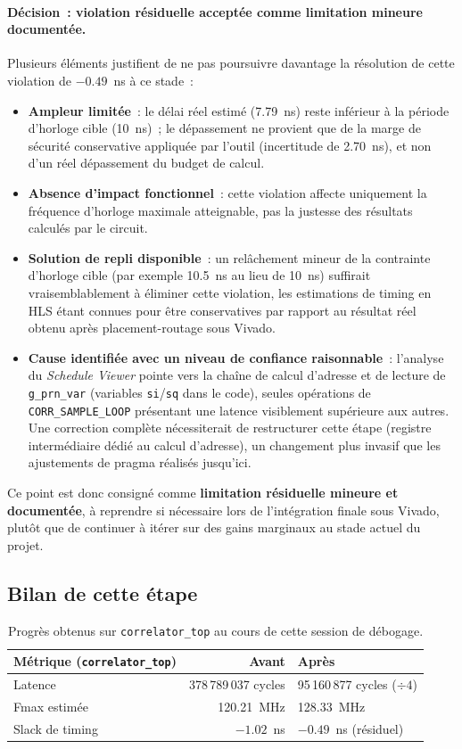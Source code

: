 \documentclass[11pt,a4paper]{article}
\begin{document}
\paragraph{Décision~: violation résiduelle acceptée comme limitation mineure documentée.}
Plusieurs éléments justifient de ne pas poursuivre davantage la résolution de cette violation de $-0.49$~ns à ce stade~:
\begin{itemize}
  \item \textbf{Ampleur limitée}~: le délai réel estimé (7.79~ns) reste inférieur à la période d'horloge cible (10~ns)~; le dépassement ne provient que de la marge de sécurité conservative appliquée par l'outil (incertitude de 2.70~ns), et non d'un réel dépassement du budget de calcul.
  \item \textbf{Absence d'impact fonctionnel}~: cette violation affecte uniquement la fréquence d'horloge maximale atteignable, pas la justesse des résultats calculés par le circuit.
  \item \textbf{Solution de repli disponible}~: un relâchement mineur de la contrainte d'horloge cible (par exemple 10.5~ns au lieu de 10~ns) suffirait vraisemblablement à éliminer cette violation, les estimations de timing en HLS étant connues pour être conservatives par rapport au résultat réel obtenu après placement-routage sous Vivado.
  \item \textbf{Cause identifiée avec un niveau de confiance raisonnable}~: l'analyse du \textit{Schedule Viewer} pointe vers la chaîne de calcul d'adresse et de lecture de \texttt{g\_prn\_var} (variables \texttt{si}/\texttt{sq} dans le code), seules opérations de \texttt{CORR\_SAMPLE\_LOOP} présentant une latence visiblement supérieure aux autres. Une correction complète nécessiterait de restructurer cette étape (registre intermédiaire dédié au calcul d'adresse), un changement plus invasif que les ajustements de pragma réalisés jusqu'ici.
\end{itemize}

Ce point est donc consigné comme \textbf{limitation résiduelle mineure et documentée}, à reprendre si nécessaire lors de l'intégration finale sous Vivado, plutôt que de continuer à itérer sur des gains marginaux au stade actuel du projet.

\subsection{Bilan de cette étape}

\begin{table}[H]
\centering
\renewcommand{\arraystretch}{1.3}
\begin{tabular}{lrl}
\toprule
\textbf{Métrique (\texttt{correlator\_top})} & \textbf{Avant} & \textbf{Après} \\
\midrule
Latence & 378\,789\,037 cycles & 95\,160\,877 cycles ($\div 4$) \\
Fmax estimée & 120.21~MHz & 128.33~MHz \\
Slack de timing & $-1.02$~ns & $-0.49$~ns (résiduel) \\
\bottomrule
\end{tabular}
\caption{Progrès obtenus sur \texttt{correlator\_top} au cours de cette session de débogage.}
\end{table}
\end{document}
